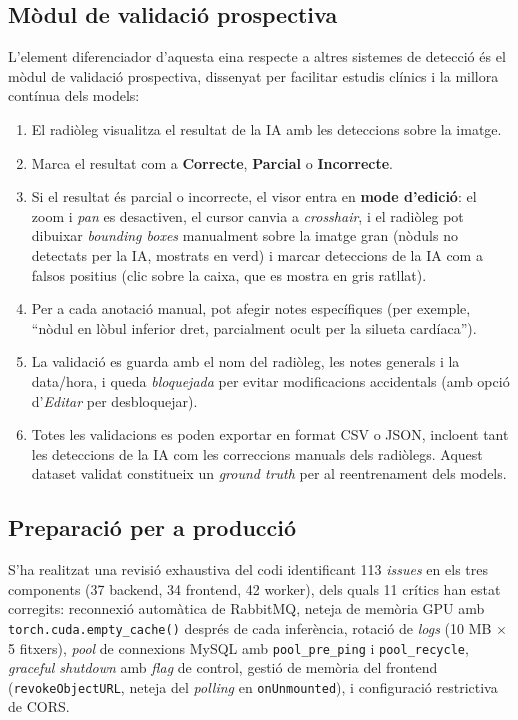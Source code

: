 \subsection{Mòdul de validació prospectiva}

L'element diferenciador d'aquesta eina respecte a altres sistemes de detecció és el mòdul de validació prospectiva, dissenyat per facilitar estudis clínics i la millora contínua dels models:

\begin{enumerate}
    \item El radiòleg visualitza el resultat de la IA amb les deteccions sobre la imatge.
    \item Marca el resultat com a \textbf{Correcte}, \textbf{Parcial} o \textbf{Incorrecte}.
    \item Si el resultat és parcial o incorrecte, el visor entra en \textbf{mode d'edició}: el zoom i \textit{pan} es desactiven, el cursor canvia a \textit{crosshair}, i el radiòleg pot dibuixar \textit{bounding boxes} manualment sobre la imatge gran (nòduls no detectats per la IA, mostrats en verd) i marcar deteccions de la IA com a falsos positius (clic sobre la caixa, que es mostra en gris ratllat).
    \item Per a cada anotació manual, pot afegir notes específiques (per exemple, ``nòdul en lòbul inferior dret, parcialment ocult per la silueta cardíaca'').
    \item La validació es guarda amb el nom del radiòleg, les notes generals i la data/hora, i queda \textit{bloquejada} per evitar modificacions accidentals (amb opció d'\textit{Editar} per desbloquejar).
    \item Totes les validacions es poden exportar en format CSV o JSON, incloent tant les deteccions de la IA com les correccions manuals dels radiòlegs. Aquest dataset validat constitueix un \textit{ground truth} per al reentrenament dels models.
\end{enumerate}

\subsection{Preparació per a producció}

S'ha realitzat una revisió exhaustiva del codi identificant 113 \textit{issues} en els tres components (37 backend, 34 frontend, 42 worker), dels quals 11 crítics han estat corregits: reconnexió automàtica de RabbitMQ, neteja de memòria GPU amb \texttt{torch.cuda.empty\_cache()} després de cada inferència, rotació de \textit{logs} (10 MB $\times$ 5 fitxers), \textit{pool} de connexions MySQL amb \texttt{pool\_pre\_ping} i \texttt{pool\_recycle}, \textit{graceful shutdown} amb \textit{flag} de control, gestió de memòria del frontend (\texttt{revokeObjectURL}, neteja del \textit{polling} en \texttt{onUnmounted}), i configuració restrictiva de CORS.

